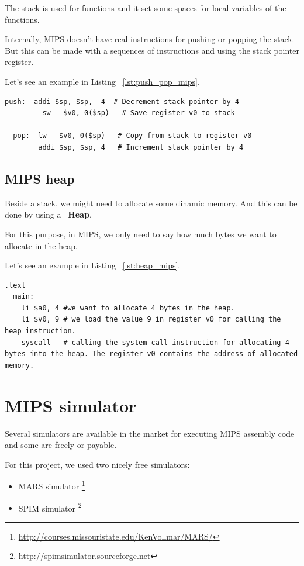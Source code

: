 \documentclass[
  oneside,
  11pt, a4paper,
  footinclude=true,
  headinclude=true,
  cleardoublepage=empty
]{scrbook}
\begin{document}
The stack is used for functions and it set some spaces for local variables of the functions.

Internally, MIPS doesn't have real instructions for pushing or popping the stack.
But this can be made with a sequences of instructions and using the stack pointer register.

Let's see an example in Listing ~\ref{lst:push_pop_mips}.

\begin{lstlisting}[caption={Example of push and pop instructions in MIPS},label={lst:push_pop_mips}]
  push:  addi $sp, $sp, -4  # Decrement stack pointer by 4
         sw   $v0, 0($sp)   # Save register v0 to stack

  pop:  lw   $v0, 0($sp)   # Copy from stack to register v0
        addi $sp, $sp, 4   # Increment stack pointer by 4
\end{lstlisting}

\subsection{MIPS heap}
Beside a stack, we might need to allocate some dinamic memory.
And this can be done by using a ~\textbf{Heap}.

For this purpose, in MIPS, we only need to say how much bytes we want to allocate in the heap.

Let's see an example in Listing ~\ref{lst:heap_mips}.

\begin{lstlisting}[caption={Example of code for allocating in the heap}, label={lst:heap_mips}]
.text 
  main:
    li $a0, 4 #we want to allocate 4 bytes in the heap.
    li $v0, 9 # we load the value 9 in register v0 for calling the heap instruction.
    syscall   # calling the system call instruction for allocating 4 bytes into the heap. The register v0 contains the address of allocated memory.
\end{lstlisting}

\section{MIPS simulator}

Several simulators are available in the market for executing MIPS assembly code and some are freely or payable.

For this project, we used two nicely free simulators:
\begin{itemize}
\item MARS simulator \footnote{\url{http://courses.missouristate.edu/KenVollmar/MARS/}}
\item SPIM simulator \footnote{\url{http://spimsimulator.sourceforge.net}}
\end{itemize}
\end{document}
